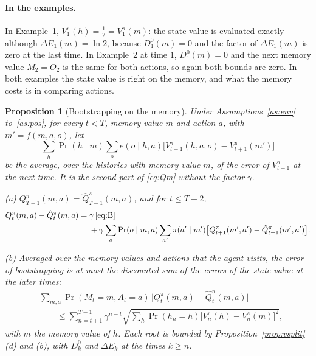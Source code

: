 \documentclass{article}
\newtheorem{proposition}{Proposition}[section]
\theoremstyle{definition}
\newcommand{\dE}{\Delta E}
\begin{document}
\paragraph{In the examples.} In Example~1, $V^\pi_1(h)=\tfrac12=V^\pi_1(m)$: the state value is evaluated exactly although $\dE_1(m)=\ln2$, because $D^0_1(m)=0$ and the factor of $\dE_1(m)$ is zero at the last time. In Example~2 at time $1$, $D^0_1(m)=0$ and the next memory value $M_2=O_2$ is the same for both actions, so again both bounds are zero. In both examples the state value is right on the memory, and what the memory costs is in comparing actions.

\begin{proposition}[Bootstrapping on the memory]\label{prop:bootstrap}
Under Assumptions~\ref{as:env} to~\ref{as:pos}, for every $t<T$, memory value $m$ and action $a$, with $m'=f(m,a,o)$, let
\begin{equation}\label{eq:B}
\sum_h\Pr(h\mid m)\sum_oe(o\mid h,a)\big[V^\pi_{t+1}(h,a,o)-V^\pi_{t+1}(m')\big]
\end{equation}
be the average, over the histories with memory value $m$, of the error of $V^\pi_{t+1}$ at the next time. It is the second part of \eqref{eq:Qm} without the factor $\gamma$.

(a) $Q^\pi_{T-1}(m,a)=\hat Q^\pi_{T-1}(m,a)$, and for $t\le T-2$,
\begin{align*}
Q^\pi_t(m,a)-\hat Q^\pi_t(m,a)={}&\gamma\,\eqref{eq:B}\\
&+\gamma\sum_o\Pr(o\mid m,a)\sum_{a'}\pi(a'\mid m')\big[Q^\pi_{t+1}(m',a')-\hat Q^\pi_{t+1}(m',a')\big].
\end{align*}

(b) Averaged over the memory values and actions that the agent visits, the error of bootstrapping is at most the discounted sum of the errors of the state value at the later times:
\begin{align*}
&\sum_{m,a}\Pr(M_t=m,A_t=a)\,\big|Q^\pi_t(m,a)-\hat Q^\pi_t(m,a)\big|\\
&\qquad\le\sum_{n=t+1}^{T-1}\gamma^{n-t}\sqrt{\sum_h\Pr(h_n=h)\big[V^\pi_n(h)-V^\pi_n(m)\big]^2},
\end{align*}
with $m$ the memory value of $h$. Each root is bounded by Proposition~\ref{prop:vsplit}(d) and (b), with $D^0_k$ and $\dE_k$ at the times $k\ge n$.
\end{proposition}
\end{document}
